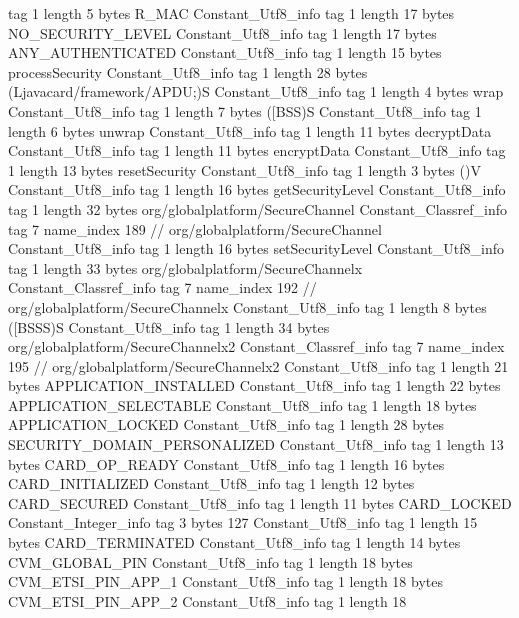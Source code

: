 {{{			tag	1
			length	5
			bytes	R_MAC
		}
		Constant_Utf8_info {
			tag	1
			length	17
			bytes	NO_SECURITY_LEVEL
		}
		Constant_Utf8_info {
			tag	1
			length	17
			bytes	ANY_AUTHENTICATED
		}
		Constant_Utf8_info {
			tag	1
			length	15
			bytes	processSecurity
		}
		Constant_Utf8_info {
			tag	1
			length	28
			bytes	(Ljavacard/framework/APDU;)S
		}
		Constant_Utf8_info {
			tag	1
			length	4
			bytes	wrap
		}
		Constant_Utf8_info {
			tag	1
			length	7
			bytes	([BSS)S
		}
		Constant_Utf8_info {
			tag	1
			length	6
			bytes	unwrap
		}
		Constant_Utf8_info {
			tag	1
			length	11
			bytes	decryptData
		}
		Constant_Utf8_info {
			tag	1
			length	11
			bytes	encryptData
		}
		Constant_Utf8_info {
			tag	1
			length	13
			bytes	resetSecurity
		}
		Constant_Utf8_info {
			tag	1
			length	3
			bytes	()V
		}
		Constant_Utf8_info {
			tag	1
			length	16
			bytes	getSecurityLevel
		}
		Constant_Utf8_info {
			tag	1
			length	32
			bytes	org/globalplatform/SecureChannel
		}
		Constant_Classref_info {
			tag	7
			name_index	189		// org/globalplatform/SecureChannel
		}
		Constant_Utf8_info {
			tag	1
			length	16
			bytes	setSecurityLevel
		}
		Constant_Utf8_info {
			tag	1
			length	33
			bytes	org/globalplatform/SecureChannelx
		}
		Constant_Classref_info {
			tag	7
			name_index	192		// org/globalplatform/SecureChannelx
		}
		Constant_Utf8_info {
			tag	1
			length	8
			bytes	([BSSS)S
		}
		Constant_Utf8_info {
			tag	1
			length	34
			bytes	org/globalplatform/SecureChannelx2
		}
		Constant_Classref_info {
			tag	7
			name_index	195		// org/globalplatform/SecureChannelx2
		}
		Constant_Utf8_info {
			tag	1
			length	21
			bytes	APPLICATION_INSTALLED
		}
		Constant_Utf8_info {
			tag	1
			length	22
			bytes	APPLICATION_SELECTABLE
		}
		Constant_Utf8_info {
			tag	1
			length	18
			bytes	APPLICATION_LOCKED
		}
		Constant_Utf8_info {
			tag	1
			length	28
			bytes	SECURITY_DOMAIN_PERSONALIZED
		}
		Constant_Utf8_info {
			tag	1
			length	13
			bytes	CARD_OP_READY
		}
		Constant_Utf8_info {
			tag	1
			length	16
			bytes	CARD_INITIALIZED
		}
		Constant_Utf8_info {
			tag	1
			length	12
			bytes	CARD_SECURED
		}
		Constant_Utf8_info {
			tag	1
			length	11
			bytes	CARD_LOCKED
		}
		Constant_Integer_info {
			tag	3
			bytes	127
		}
		Constant_Utf8_info {
			tag	1
			length	15
			bytes	CARD_TERMINATED
		}
		Constant_Utf8_info {
			tag	1
			length	14
			bytes	CVM_GLOBAL_PIN
		}
		Constant_Utf8_info {
			tag	1
			length	18
			bytes	CVM_ETSI_PIN_APP_1
		}
		Constant_Utf8_info {
			tag	1
			length	18
			bytes	CVM_ETSI_PIN_APP_2
		}
		Constant_Utf8_info {
			tag	1
			length	18
}}}
